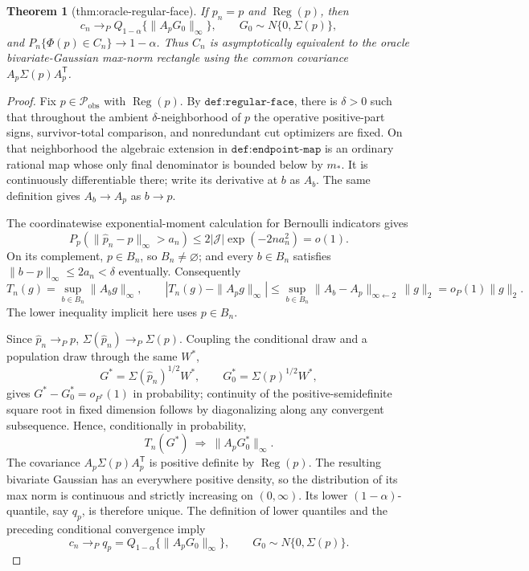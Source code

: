 \documentclass{article}
\newtheorem{theorem}{Theorem}
\begin{document}
\begin{theorem}[thm:oracle-regular-face]\label{thm:oracle-regular-face}
If \(p_n=p\) and \(\operatorname{Reg}(p)\), then \[c_n\to_P Q_{1-\alpha}\{\|A_pG_0\|_\infty\},\qquad G_0\sim N\{0,\Sigma(p)\},\] and \(P_n\{\Phi(p)\in C_n\}\to1-\alpha\). Thus \(C_n\) is asymptotically equivalent to the oracle bivariate-Gaussian max-norm rectangle using the common covariance \(A_p\Sigma(p)A_p^{\mathsf T}\).
\end{theorem}
\begin{proof}
Fix \(p\in\mathcal P_{\mathrm{obs}}\) with \(\operatorname{Reg}(p)\).  By \(\texttt{def:regular-face}\), there is \(\delta>0\) such that throughout the ambient \(\delta\)-neighborhood of \(p\) the operative positive-part signs, survivor-total comparison, and nonredundant cut optimizers are fixed.  On that neighborhood the algebraic extension in \(\texttt{def:endpoint-map}\) is an ordinary rational map whose only final denominator is bounded below by \(m_*\).  It is continuously differentiable there; write its derivative at \(b\) as \(A_b\).  The same definition gives \(A_b\to A_p\) as \(b\to p\).

The coordinatewise exponential-moment calculation for Bernoulli indicators gives
\[
P_p\!\left(\|\widehat p_n-p\|_\infty>a_n\right)
\le 2|\mathcal J|\exp(-2na_n^2)=o(1).
\]
On its complement, \(p\in B_n\), so \(B_n\ne\varnothing\); and every \(b\in B_n\) satisfies \(\|b-p\|_\infty\le2a_n<\delta\) eventually.  Consequently
\[
T_n(g)=\sup_{b\in B_n}\|A_bg\|_\infty,
\qquad
\left|T_n(g)-\|A_pg\|_\infty\right|
\le \sup_{b\in B_n}\|A_b-A_p\|_{\infty\leftarrow2}\,\|g\|_2=o_P(1)\|g\|_2.
\]
The lower inequality implicit here uses \(p\in B_n\).

Since \(\widehat p_n\to_Pp\), \(\Sigma(\widehat p_n)\to_P\Sigma(p)\).  Coupling the conditional draw and a population draw through the same \(W^*\),
\[
G^*=\Sigma(\widehat p_n)^{1/2}W^*,
\qquad
G_0^*=\Sigma(p)^{1/2}W^*,
\]
gives \(G^*-G_0^*=o_{P^*}(1)\) in probability; continuity of the positive-semidefinite square root in fixed dimension follows by diagonalizing along any convergent subsequence.  Hence, conditionally in probability,
\[
T_n(G^*)\ \Rightarrow\ \|A_pG_0^*\|_\infty.
\]
The covariance \(A_p\Sigma(p)A_p^{\mathsf T}\) is positive definite by \(\operatorname{Reg}(p)\).  The resulting bivariate Gaussian has an everywhere positive density, so the distribution of its max norm is continuous and strictly increasing on \((0,\infty)\).  Its lower \((1-\alpha)\)-quantile, say \(q_p\), is therefore unique.  The definition of lower quantiles and the preceding conditional convergence imply
\[
c_n\to_Pq_p=Q_{1-\alpha}\{\|A_pG_0\|_\infty\},
\qquad G_0\sim N\{0,\Sigma(p)\}.
\]


\end{proof}
\end{document}
